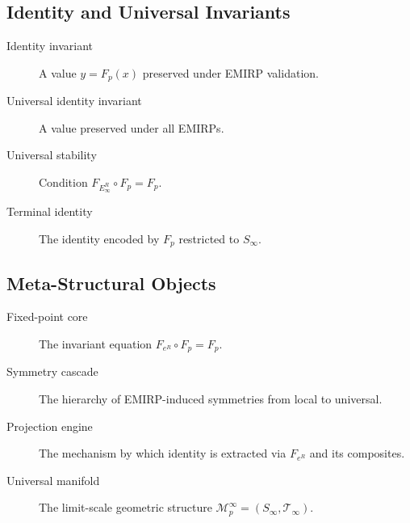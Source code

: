\documentclass[11pt]{article}
\theoremstyle{definition}
\theoremstyle{plain}
\theoremstyle{remark}
\begin{document}
\subsection*{Identity and Universal Invariants}

\begin{description}

\item[Identity invariant] A value $y = F_p(x)$ preserved under EMIRP
validation.

\item[Universal identity invariant] A value preserved under all EMIRPs.

\item[Universal stability] Condition $F_{E_\infty^R} \circ F_p = F_p$.

\item[Terminal identity] The identity encoded by $F_p$ restricted to
$S_\infty$.

\end{description}

\subsection*{Meta-Structural Objects}

\begin{description}

\item[Fixed-point core] The invariant equation
$F_{e^R} \circ F_p = F_p$.

\item[Symmetry cascade] The hierarchy of EMIRP-induced symmetries from
local to universal.

\item[Projection engine] The mechanism by which identity is extracted
via $F_{e^R}$ and its composites.

\item[Universal manifold] The limit-scale geometric structure
$\mathcal{M}_p^\infty = (S_\infty, \mathcal{T}_\infty)$.

\end{description}
\end{document}
